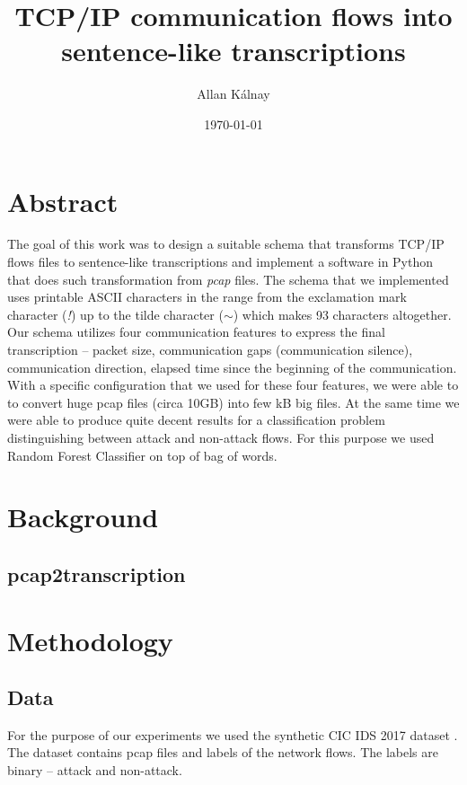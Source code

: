 \documentclass{article}
\title{TCP/IP communication flows into sentence-like transcriptions}
\author{Allan Kálnay}
\date{\today}
\begin{document}
    \sloppy

    \maketitle

    \section*{Abstract}
    The goal of this work was to design a suitable schema that transforms TCP/IP flows files to sentence-like transcriptions and implement a software in Python that does such transformation from \textit{pcap} files. The schema that we implemented uses printable ASCII characters in the range from the exclamation mark character (\textit{!}) up to the tilde character (\textit{$\sim$}) which makes 93 characters altogether. Our schema utilizes four communication features to express the final transcription -- packet size, communication gaps (communication silence), communication direction, elapsed time since the beginning of the communication. With a specific configuration that we used for these four features, we were able to to convert huge pcap files (circa 10GB) into few kB big files. At the same time we were able to produce quite decent results for a classification problem distinguishing between attack and non-attack flows. For this purpose we used Random Forest Classifier on top of bag of words.

    \newpage
    \tableofcontents
    \newpage

    \section{Background}
    \subsection{pcap2transcription}

    \section{Methodology}
    \subsection{Data}
    For the purpose of our experiments we used the synthetic CIC IDS 2017 dataset \cite{sharafaldin2018toward}. The dataset contains pcap files and labels of the network flows. The labels are binary -- attack and non-attack.
\end{document}
